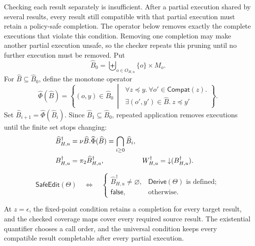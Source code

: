Checking each result separately is insufficient.
After a partial execution shared by several results, every result still compatible with that partial execution must retain a policy-safe completion.
The operator below removes exactly the complete executions that violate this condition.
Removing one completion may make another partial execution unsafe, so the checker repeats this pruning until no further execution must be removed.
Put
\[
 \widehat B_0=\biguplus_{o\in O_{H,u}}\{o\}\times M_o .
\]
For \(\widehat B\subseteq\widehat B_0\), define the monotone operator
\begin{equation}
\label{eq:robust-operator}
\widehat\Phi(\widehat B)=
\left\{(o,y)\in\widehat B_0\ \middle|\
\begin{array}{l}
\forall z\preceq y.\ \forall o'\in\mathsf{Compat}(z).\\[-2pt]
\exists (o',y')\in\widehat B.\ z\preceq y'
\end{array}\right\}.
\end{equation}
Set \(\widehat B_{i+1}=\widehat\Phi(\widehat B_i)\).
Since \(\widehat B_1\subseteq\widehat B_0\), repeated application removes executions until the finite set stops changing:
\[
\begin{aligned}
 \widehat B^\dagger_{H,u}
   &=\nu\widehat B.\widehat\Phi(\widehat B)
     =\bigcap_{i\geq 0}\widehat B_i,\\
 B^\dagger_{H,u}&=\pi_2\widehat B^\dagger_{H,u},
 &W^\dagger_{H,u}&=\mathord{\downarrow}(B^\dagger_{H,u}).
\end{aligned}
\]
\begin{definition}
\label{def:safe-execution-edit}
\begin{equation}
\label{eq:largest-safe-set}
\mathsf{SafeEdit}(\Theta)
 \quad\Longleftrightarrow\quad
 \begin{cases}
 \widehat B^\dagger_{H,u}\ne\varnothing,
   & \mathsf{Derive}(\Theta)\text{ is defined};\\
 \mathsf{false},&\text{otherwise}.
 \end{cases}
\end{equation}
\end{definition}
At \(z=\epsilon\), the fixed-point condition retains a completion for every target result, and the checked coverage maps cover every required source result.
The existential quantifier chooses a call order, and the universal condition keeps every compatible result completable after every partial execution.

